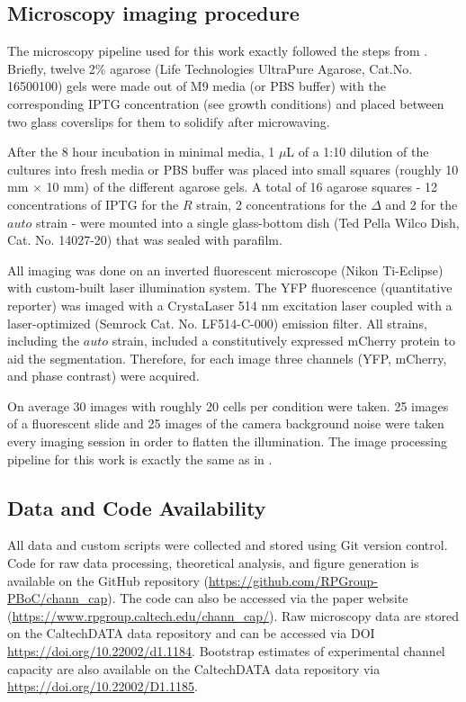 \subsection{Microscopy imaging procedure}

The microscopy pipeline used for this work exactly followed the steps from
\cite{Razo-Mejia2018}. Briefly, twelve 2\% agarose (Life Technologies UltraPure
Agarose, Cat.No. 16500100) gels were made out of M9 media (or PBS buffer) with
the corresponding IPTG concentration (see growth conditions) and placed between
two glass coverslips for them to solidify after microwaving.

After the 8 hour incubation in minimal media, 1 $\mu$L of a 1:10 dilution of the
cultures into fresh media or PBS buffer was placed into small squares (roughly
10 mm $\times$ 10 mm) of the different agarose gels. A total of 16 agarose
squares - 12 concentrations of IPTG for the $R$ strain, 2 concentrations for
the $\Delta$ and 2 for the $auto$ strain - were mounted into a single
glass-bottom dish (Ted Pella Wilco Dish, Cat. No. 14027-20) that was sealed
with parafilm.

All imaging was done on an inverted fluorescent microscope (Nikon Ti-Eclipse)
with custom-built laser illumination system. The YFP fluorescence (quantitative
reporter) was imaged with a CrystaLaser 514 nm excitation laser coupled with a
laser-optimized (Semrock Cat. No. LF514-C-000) emission filter. All strains,
including the $auto$ strain, included a constitutively expressed mCherry
protein to aid the segmentation. Therefore, for each image three channels (YFP,
mCherry, and phase contrast) were acquired.

On average 30 images with roughly 20 cells per condition were taken. 25 images
of a fluorescent slide and 25 images of the camera background noise were taken
every imaging session in order to flatten the illumination. The image
processing pipeline for this work is exactly the same as in
\cite{Razo-Mejia2018}.

\subsection{Data and Code Availability}

All data and custom scripts were collected and stored using Git version
control. Code for raw data processing, theoretical analysis, and figure
generation is available on the GitHub repository
(\url{https://github.com/RPGroup-PBoC/chann_cap}). The code can also be
accessed via the paper website
(\url{https://www.rpgroup.caltech.edu/chann_cap/}). Raw microscopy data are
stored on the CaltechDATA data repository and can be accessed via DOI
\url{https://doi.org/10.22002/d1.1184}. Bootstrap estimates of experimental
channel capacity are also available on the CaltechDATA data repository via
\url{https://doi.org/10.22002/D1.1185}.
